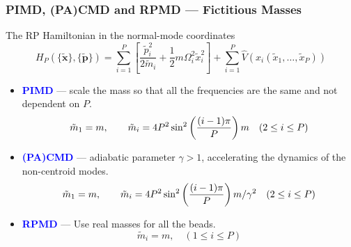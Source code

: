 \begin{frame}
  \frametitle{PIMD, (PA)CMD and RPMD --- Fictitious Masses}
  The RP Hamiltonian in the normal-mode coordinates
  \begin{equation*}
    H_P(\{\mathbf{\tilde{x}}\}, \{\mathbf{\tilde{p}}\}) =
    \sum_{i=1}^P
    \left[
      \frac{\tilde{p}_i^2}{2\tilde{m}_i}
      +
      \frac{1}{2} m \Omega_i^2 \tilde{x}_i^2
    \right]
      +
      \sum_{i=1}^P 
      \hat{V}\left(x_i(\tilde{x}_1,\ldots,\tilde{x}_P)\right)
  \end{equation*}
  \medskip
  \begin{itemize}
  \item \textcolor{blue}{\textbf{PIMD}} --- scale the mass so that all the frequencies are the
    same and not dependent on $P$.
    \begin{equation*}
      \tilde{m}_1 = m, \qquad \tilde{m}_i = 4P^2\sin^2\left({(i-1)\pi\over
          P}\right) m \quad (2 \le i \le P)
    \end{equation*}
  \item \textcolor{blue}{\textbf{(PA)CMD}} --- adiabatic parameter $\gamma > 1$, accelerating the dynamics of the non-centroid modes.
    \begin{equation*}
      \tilde{m}_1 = m, \qquad \tilde{m}_i = 4P^2\sin^2\left({(i-1)\pi\over
          P}\right) m / \gamma^2 \quad (2 \le i \le P)
    \end{equation*}
  \item \textcolor{blue}{\textbf{RPMD}} --- Use real masses for all the beads.
    \begin{equation*}
      \tilde{m}_i = m, \quad (1 \le i \le P)
    \end{equation*}
  \end{itemize}
\end{frame}
